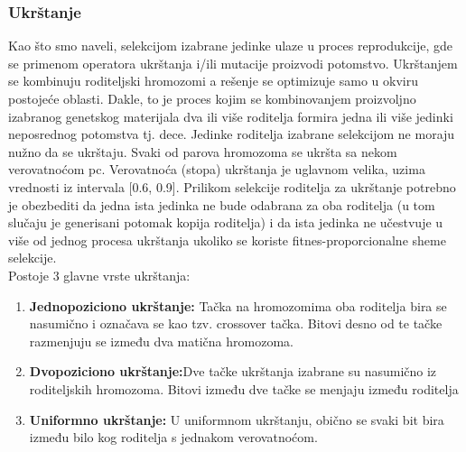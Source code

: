 \documentclass[a4paper]{article}
\begin{document}
\subsubsection{Ukrštanje}
Kao što smo naveli, selekcijom izabrane jedinke ulaze u proces reprodukcije, gde se primenom operatora ukrštanja i/ili mutacije proizvodi potomstvo. Ukrštanjem se kombinuju roditeljski hromozomi a rešenje se optimizuje samo u okviru postojeće oblasti. Dakle, to je proces kojim se kombinovanjem proizvoljno izabranog genetskog materijala dva ili više roditelja formira jedna ili više jedinki neposrednog potomstva tj. dece. Jedinke roditelja izabrane selekcijom ne moraju nužno da se ukrštaju. Svaki od parova hromozoma se ukršta sa nekom verovatnoćom pc. Verovatnoća (stopa) ukrštanja je uglavnom velika, uzima vrednosti iz intervala [0.6, 0.9]. Prilikom selekcije roditelja za ukrštanje potrebno je obezbediti da jedna ista jedinka ne bude odabrana za oba roditelja (u tom slučaju je generisani potomak kopija roditelja) i da ista jedinka ne učestvuje u više od jednog procesa ukrštanja ukoliko se koriste fitnes-proporcionalne sheme selekcije.\\ Postoje 3 glavne vrste ukrštanja:
\begin{enumerate}
                \item \textbf{Jednopoziciono ukrštanje:} Tačka na hromozomima oba roditelja bira se nasumično i označava se kao tzv. crossover tačka. Bitovi desno od te tačke razmenjuju se između dva matična hromozoma. 
                \item \textbf{Dvopoziciono ukrštanje:}Dve tačke ukrštanja izabrane su nasumično iz roditeljskih hromozoma. Bitovi između dve tačke se menjaju između roditelja
                \item \textbf{Uniformno ukrštanje:} U uniformnom ukrštanju, obično se svaki bit bira između bilo kog roditelja s jednakom verovatnoćom. 
\end{enumerate}
\end{document}
